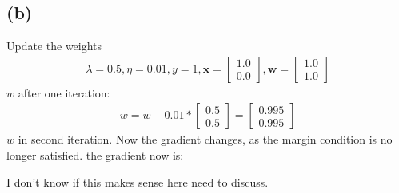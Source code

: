 \documentclass{article}
\begin{document}
\subsection{(b)}
Update the weights
\begin{align}
    \lambda=0.5, \eta=0.01, y=1, \boldsymbol{x}=\left[\begin{array}{l}
1.0 \\
0.0
\end{array}\right], \boldsymbol{w}=\left[\begin{array}{l}
1.0 \\
1.0
\end{array}\right]
\end{align}
$w$ after one iteration:
\begin{align}
    w = w - 0.01 * \left[\begin{array}{l}
0.5 \\
0.5
\end{array}\right] = \left[\begin{array}{l}
0.995 \\
0.995
\end{array}\right]
\end{align}
$w$ in second iteration. Now the gradient changes, as the margin condition is no longer satisfied. the gradient now is:

I don't know if this makes sense here need to discuss.


\begin{align}
    
\end{align}
\end{document}
